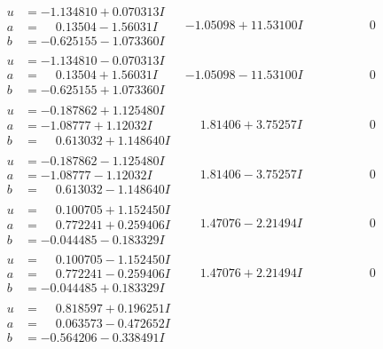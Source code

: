 \documentclass[1p]{elsarticle_modified}
\theoremstyle{definition}
\begin{document}
$$\begin{array}{c|c|c}
\begin{aligned}
u &= -1.134810 + 0.070313 I \\
a &= \phantom{-}0.13504 - 1.56031 I \\
b &= -0.625155 - 1.073360 I\end{aligned}
 & -1.05098 + 11.53100 I & \phantom{-0.000000 } 0 \\ \hline\begin{aligned}
u &= -1.134810 - 0.070313 I \\
a &= \phantom{-}0.13504 + 1.56031 I \\
b &= -0.625155 + 1.073360 I\end{aligned}
 & -1.05098 - 11.53100 I & \phantom{-0.000000 } 0 \\ \hline\begin{aligned}
u &= -0.187862 + 1.125480 I \\
a &= -1.08777 + 1.12032 I \\
b &= \phantom{-}0.613032 + 1.148640 I\end{aligned}
 & \phantom{-}1.81406 + 3.75257 I & \phantom{-0.000000 } 0 \\ \hline\begin{aligned}
u &= -0.187862 - 1.125480 I \\
a &= -1.08777 - 1.12032 I \\
b &= \phantom{-}0.613032 - 1.148640 I\end{aligned}
 & \phantom{-}1.81406 - 3.75257 I & \phantom{-0.000000 } 0 \\ \hline\begin{aligned}
u &= \phantom{-}0.100705 + 1.152450 I \\
a &= \phantom{-}0.772241 + 0.259406 I \\
b &= -0.044485 - 0.183329 I\end{aligned}
 & \phantom{-}1.47076 - 2.21494 I & \phantom{-0.000000 } 0 \\ \hline\begin{aligned}
u &= \phantom{-}0.100705 - 1.152450 I \\
a &= \phantom{-}0.772241 - 0.259406 I \\
b &= -0.044485 + 0.183329 I\end{aligned}
 & \phantom{-}1.47076 + 2.21494 I & \phantom{-0.000000 } 0 \\ \hline\begin{aligned}
u &= \phantom{-}0.818597 + 0.196251 I \\
a &= \phantom{-}0.063573 - 0.472652 I \\
b &= -0.564206 - 0.338491 I\end{aligned}

\end{array}$$
\end{document}

